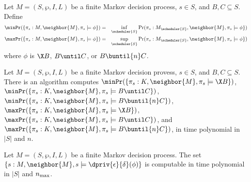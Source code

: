 {Let $M = (S, \wp, I, L)$ be a finite Markov decision process, $s \in
S$, and $B, C \subseteq S$. Define
\begin{eqnarray*}
  \minPr (\{ \pi_s : M, \neighbor{M}, \pi_s \models \phi \}) & = &
  \inf_{\scheduler{S}} \Pr (\pi_s : M_{\scheduler{S}}, \neighbor{M},
  \pi_s \models \phi \})\\  
  \maxPr (\{ \pi_s : M, \neighbor{M}, \pi_s \models \phi \}) & = &
  \sup_{\scheduler{S}} \Pr (\pi_s : M_{\scheduler{S}}, \neighbor{M}, 
  \pi_s \models \phi \})\\
\end{eqnarray*}
where $\phi$ is $\X B$, $B \until C$, or $B \buntil{n} C$.

\begin{theorem}
  Let $M = (S, \wp, I, L)$ be a finite Markov decision provess, $s
  \in S$, and $B, C \subseteq S$. There is an algorithm
  computes $\minPr(\{ \pi_s : K, \neighbor{M}, \pi_s \models \X B \})$,
  $\minPr(\{ \pi_s : K, \neighbor{M}, \pi_s \models B \until C \})$,  
  $\minPr(\{ \pi_s : K, \neighbor{M}, \pi_s \models B \buntil{n} C \})$,
  $\maxPr(\{ \pi_s : K, \neighbor{M}, \pi_s \models \X B \})$,
  $\maxPr(\{ \pi_s : K, \neighbor{M}, \pi_s \models B \until C \})$, and
  $\maxPr(\{ \pi_s : K, \neighbor{M}, \pi_s \models B \buntil{n} C \})$,  
  in time  polynomial in $|S|$ and $n$.
\end{theorem}

\begin{lemma}
  Let $M = (S, \wp, I, L)$ be a finite Markov decision process. The
  set $\{ s : M, \neighbor{M}, s \models \dpriv{\epsilon}{\delta} (\phi) \}$ is
  computable in time polynomial in $|S|$ and $n_{\textmd{max}}$.
\end{lemma}

}
